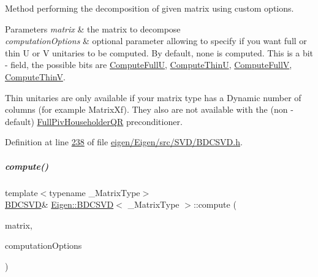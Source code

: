 Method performing the decomposition of given matrix using custom options. 


\begin{DoxyParams}{Parameters}
{\em matrix} & the matrix to decompose \\
\hline
{\em computation\+Options} & optional parameter allowing to specify if you want full or thin U or V unitaries to be computed. By default, none is computed. This is a bit -\/ field, the possible bits are \hyperlink{group__enums_ggae3e239fb70022eb8747994cf5d68b4a9a2b4f91ca5859a4159dbfe8090043817f}{Compute\+FullU}, \hyperlink{group__enums_ggae3e239fb70022eb8747994cf5d68b4a9af8c742a1aa87773e165eae406c9ccaf8}{Compute\+ThinU}, \hyperlink{group__enums_ggae3e239fb70022eb8747994cf5d68b4a9a52c6f7e80bbf9a42297c88f700245b51}{Compute\+FullV}, \hyperlink{group__enums_ggae3e239fb70022eb8747994cf5d68b4a9a1055e53fa95c8ae04a07ebb72cfafd95}{Compute\+ThinV}.\\
\hline
\end{DoxyParams}
Thin unitaries are only available if your matrix type has a Dynamic number of columns (for example Matrix\+Xf). They also are not available with the (non -\/ default) \hyperlink{group___q_r___module_class_eigen_1_1_full_piv_householder_q_r}{Full\+Piv\+Householder\+QR} preconditioner. 

Definition at line \hyperlink{eigen_2_eigen_2src_2_s_v_d_2_b_d_c_s_v_d_8h_source_l00238}{238} of file \hyperlink{eigen_2_eigen_2src_2_s_v_d_2_b_d_c_s_v_d_8h_source}{eigen/\+Eigen/src/\+S\+V\+D/\+B\+D\+C\+S\+V\+D.\+h}.

\mbox{\label{group___s_v_d___module_a76d4ba0d8c9693687b8f182adbf08433}} 
\subparagraph{\texorpdfstring{compute()}{compute()}\hspace{0.1cm}{\footnotesize\ttfamily [2/4]}}
{\footnotesize\ttfamily template$<$typename \+\_\+\+Matrix\+Type$>$ \\
\hyperlink{group___s_v_d___module_class_eigen_1_1_b_d_c_s_v_d}{B\+D\+C\+S\+VD}\& \hyperlink{group___s_v_d___module_class_eigen_1_1_b_d_c_s_v_d}{Eigen\+::\+B\+D\+C\+S\+VD}$<$ \+\_\+\+Matrix\+Type $>$\+::compute (\begin{DoxyParamCaption}\item[{const Matrix\+Type \&}]{matrix,  }\item[{unsigned int}]{computation\+Options }\end{DoxyParamCaption})}



